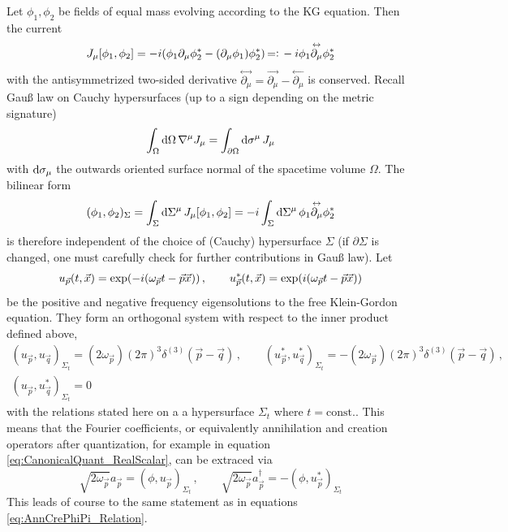 Let $\phi_1,\phi_2$ be fields of equal mass evolving according to the KG equation. Then the current
\begin{equation}
    J_\mu[\phi_1,\phi_2]=-{i}(\phi_1\partial_\mu\phi_2^*-(\partial_\mu\phi_1)\phi_2^*){\,=\vcentcolon\,}-{i}\phi_1\overset{\leftrightarrow}{\partial_\mu}\phi_2^*
\end{equation}
with the antisymmetrized two-sided derivative $\overset{\leftrightarrow}{\partial_\mu}=\overset{\rightarrow}{\partial_\mu}-\overset{\leftarrow}{\partial_\mu}$ is conserved. Recall Gauß law on Cauchy hypersurfaces (up to a sign depending on the metric signature)
\begin{equation}
    \int_\Omega\text{d} \Omega\,\nabla^\mu J_\mu=\int_{\partial\Omega}\text{d}\sigma^\mu\,J_\mu
\end{equation}
with $\text{d}\sigma_\mu$ the outwards oriented surface normal of the spacetime volume $\Omega$. The bilinear form
\begin{equation}
    (\phi_1,\phi_2)_\Sigma=\int_\Sigma\text{d}\Sigma^\mu\,J_\mu[\phi_1,\phi_2]=-{i}\int_\Sigma\text{d}\Sigma^\mu\,\phi_1\overset{\leftrightarrow}{\partial_\mu}\phi_2^*
    \label{eq:InvariantInnterProduct}
\end{equation}
is therefore independent of the choice of (Cauchy) hypersurface $\Sigma$ (if $\partial\Sigma$ is changed, one must carefully check for further contributions in Gauß law). Let 
\begin{equation}
    u_{\vec{p}}(t,\vec{x})=\exp(-{i}(\omega_{\vec{p}}t-\vec{p}\vec{x}))\,,\qquad u_{\vec{p}}^*(t,\vec{x})=\exp({i}(\omega_{\vec{p}}t-\vec{p}\vec{x}))
\end{equation}
be the positive and negative frequency eigensolutions to the free Klein-Gordon equation. They form an orthogonal system with respect to the inner product defined above,
\begin{gather}
    (u_{\vec{p}},u_{\vec{q}})_{\Sigma_t}=(2\omega_{\vec{p}})(2\pi)^3\delta^{(3)}(\vec{p}-\vec{q})\,,\qquad (u_{\vec{p}}^*,u_{\vec{q}}^*)_{\Sigma_t}=-(2\omega_{\vec{p}})(2\pi)^3\delta^{(3)}(\vec{p}-\vec{q})\,,\\
    (u_{\vec{p}},u_{\vec{q}}^*)_{\Sigma_t}=0
\end{gather}
with the relations stated here on a a hypersurface $\Sigma_t$ where $t=\text{const.}$. This means that the Fourier coefficients, or equivalently annihilation and creation operators after quantization, for example in equation \eqref{eq:CanonicalQuant_RealScalar}, can be extraced via
\begin{equation}
    \sqrt{2\omega_{\vec{p}}}a_{\vec{p}}=(\phi,u_{\vec{p}})_{\Sigma_t}\,,\qquad \sqrt{2\omega_{\vec{p}}}a_{\vec{p}}^\dagger=-(\phi,u_{\vec{p}}^*)_{\Sigma_t}
\end{equation}
This leads of course to the same statement as in equations \eqref{eq:AnnCrePhiPi_Relation}.

